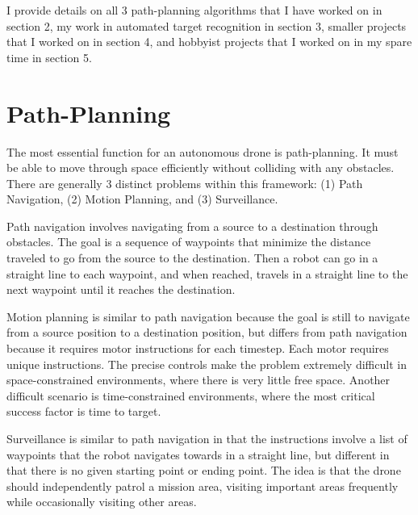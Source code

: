 \documentclass[12pt]{article}
\begin{document}
I provide details on all 3 path-planning algorithms that I have worked on in section 2, my work in automated target recognition in section 3, smaller projects that I worked on in section 4, and hobbyist projects that I worked on in my spare time in section 5.

\section{Path-Planning}
The most essential function for an autonomous drone is path-planning. It must be able to move through space efficiently without colliding with any obstacles. There are generally 3 distinct problems within this framework: (1) Path Navigation, (2) Motion Planning, and (3) Surveillance.

Path navigation involves navigating from a source to a destination through obstacles. The goal is a sequence of waypoints that minimize the distance traveled to go from the source to the destination. Then a robot can go in a straight line to each waypoint, and when reached, travels in a straight line to the next waypoint until it reaches the destination.

Motion planning is similar to path navigation because the goal is still to navigate from a source position to a destination position, but differs from path navigation because it requires motor instructions for each timestep. Each motor requires unique instructions. The precise controls make the problem extremely difficult in space-constrained environments, where there is very little free space. Another difficult scenario is time-constrained environments, where the most critical success factor is time to target.

Surveillance is similar to path navigation in that the instructions involve a list of waypoints that the robot navigates towards in a straight line, but different in that there is no given starting point or ending point. The idea is that the drone should independently patrol a mission area, visiting important areas frequently while occasionally visiting other areas.
\end{document}
